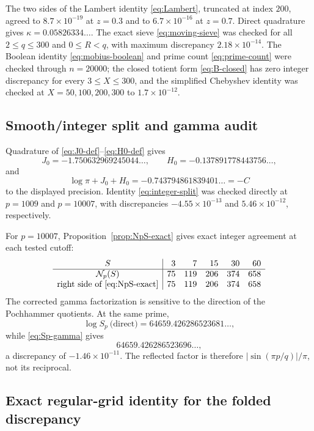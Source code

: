 \documentclass[11pt]{amsart}
\numberwithin{equation}{section}
\theoremstyle{definition}
\theoremstyle{remark}
\begin{document}
The two sides of the Lambert identity \eqref{eq:Lambert}, truncated at
index \(200\), agreed to \(8.7\times10^{-19}\) at \(z=0.3\) and to
\(6.7\times10^{-16}\) at \(z=0.7\).  Direct quadrature gives
\(\kappa=0.05826334\ldots\).  The exact sieve
\eqref{eq:moving-sieve} was checked for all \(2\le q\le300\) and
\(0\le R<q\), with maximum discrepancy \(2.18\times10^{-14}\).  The
Boolean identity \eqref{eq:mobius-boolean} and prime count
\eqref{eq:prime-count} were checked through \(n=20000\); the closed totient
form \eqref{eq:B-closed} has zero integer discrepancy for every
\(3\le X\le300\), and the simplified Chebyshev identity was checked at
\(X=50,100,200,300\) to \(1.7\times10^{-12}\).

\subsection{Smooth/integer split and gamma audit}

Quadrature of \eqref{eq:J0-def}--\eqref{eq:H0-def} gives
\[
 J_0=-1.750632969245044\ldots,
 \qquad H_0=-0.137891778443756\ldots,
\]
and
\[
 \log\pi+J_0+H_0=-0.743794861839401\ldots=-C
\]
to the displayed precision.  Identity \eqref{eq:integer-split} was checked
directly at \(p=1009\) and \(p=10007\), with discrepancies
\(-4.55\times10^{-13}\) and \(5.46\times10^{-12}\), respectively.

For \(p=10007\), Proposition~\ref{prop:NpS-exact} gives exact integer
agreement at each tested cutoff:
\[
\begin{array}{c|rrrrr}
 S&3&7&15&30&60\\ \hline
 \mathcal N_p(S)&75&119&206&374&658\\
 \text{right side of \eqref{eq:NpS-exact}}&75&119&206&374&658
\end{array}
\]
The corrected gamma factorization is sensitive to the direction of the
Pochhammer quotients.  At the same prime,
\[
 \log S_p\ \text{(direct)}=64659.426286523681\ldots,
\]
while \eqref{eq:Sp-gamma} gives
\[
 64659.426286523696\ldots,
\]
a discrepancy of \(-1.46\times10^{-11}\).  The reflected factor is
therefore \(|\sin(\pi p/q)|/\pi\), not its reciprocal.

\subsection{Exact regular-grid identity for the folded discrepancy}
\end{document}
